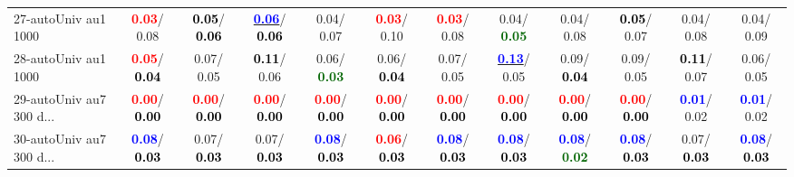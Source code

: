 \begin{table}[h]
\begin{center}
{\begin{tabular}{lc|c|c|c|c|c|c|c|c|c|c}
27-autoUniv au1 1000 & \textcolor{red}{\textbf{  0.03}}/  0.08 & \textcolor{black}{\textbf{  0.05}}/\textcolor{black}{\textbf{  0.06}} & \underline{\textcolor{blue}{\textbf{  0.06}}}/\textcolor{black}{\textbf{  0.06}} &   0.04/  0.07 & \textcolor{red}{\textbf{  0.03}}/  0.10 & \textcolor{red}{\textbf{  0.03}}/  0.08 &   0.04/\textcolor{darkgreen}{\textbf{  0.05}} &   0.04/  0.08 & \textcolor{black}{\textbf{  0.05}}/  0.07 &   0.04/  0.08 &   0.04/  0.09 \\
28-autoUniv au1 1000 & \textcolor{red}{\textbf{  0.05}}/\textcolor{black}{\textbf{  0.04}} &   0.07/  0.05 & \textcolor{black}{\textbf{  0.11}}/  0.06 &   0.06/\textcolor{darkgreen}{\textbf{  0.03}} &   0.06/\textcolor{black}{\textbf{  0.04}} &   0.07/  0.05 & \underline{\textcolor{blue}{\textbf{  0.13}}}/  0.05 &   0.09/\textcolor{black}{\textbf{  0.04}} &   0.09/  0.05 & \textcolor{black}{\textbf{  0.11}}/  0.07 &   0.06/  0.05 \\ \hline
29-autoUniv au7 300 d... & \textcolor{red}{\textbf{  0.00}}/\textcolor{black}{\textbf{  0.00}} & \textcolor{red}{\textbf{  0.00}}/\textcolor{black}{\textbf{  0.00}} & \textcolor{red}{\textbf{  0.00}}/\textcolor{black}{\textbf{  0.00}} & \textcolor{red}{\textbf{  0.00}}/\textcolor{black}{\textbf{  0.00}} & \textcolor{red}{\textbf{  0.00}}/\textcolor{black}{\textbf{  0.00}} & \textcolor{red}{\textbf{  0.00}}/\textcolor{black}{\textbf{  0.00}} & \textcolor{red}{\textbf{  0.00}}/\textcolor{black}{\textbf{  0.00}} & \textcolor{red}{\textbf{  0.00}}/\textcolor{black}{\textbf{  0.00}} & \textcolor{red}{\textbf{  0.00}}/\textcolor{black}{\textbf{  0.00}} & \textcolor{blue}{\textbf{  0.01}}/  0.02 & \textcolor{blue}{\textbf{  0.01}}/  0.02 \\
30-autoUniv au7 300 d... & \textcolor{blue}{\textbf{  0.08}}/\textcolor{black}{\textbf{  0.03}} &   0.07/\textcolor{black}{\textbf{  0.03}} &   0.07/\textcolor{black}{\textbf{  0.03}} & \textcolor{blue}{\textbf{  0.08}}/\textcolor{black}{\textbf{  0.03}} & \textcolor{red}{\textbf{  0.06}}/\textcolor{black}{\textbf{  0.03}} & \textcolor{blue}{\textbf{  0.08}}/\textcolor{black}{\textbf{  0.03}} & \textcolor{blue}{\textbf{  0.08}}/\textcolor{black}{\textbf{  0.03}} & \textcolor{blue}{\textbf{  0.08}}/\textcolor{darkgreen}{\textbf{  0.02}} & \textcolor{blue}{\textbf{  0.08}}/\textcolor{black}{\textbf{  0.03}} &   0.07/\textcolor{black}{\textbf{  0.03}} & \textcolor{blue}{\textbf{  0.08}}/\textcolor{black}{\textbf{  0.03}} \\

\end{tabular}}
\end{center}
\end{table}
